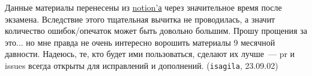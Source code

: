 Данные материалы перенесены из
\href{https://awes0me.notion.site/EX-01-c7434ef4efff4e898b176c418202c956?pvs=4}
{notion'а} через значительное время после экзамена. Вследствие этого тщательная
вычитка не проводилась, а значит количество ошибок/опечаток может быть довольно
большим. Прошу прощения за это\(\dotsc\) но мне правда не очень интересно
ворошить материалы 9 месячной давности. Надеюсь, те, кто будет ими пользоваться,
сделают их лучше~--- pr и issues всегда открыты для исправлений и дополнений.
(\texttt{isagila}, 23.09.02)
